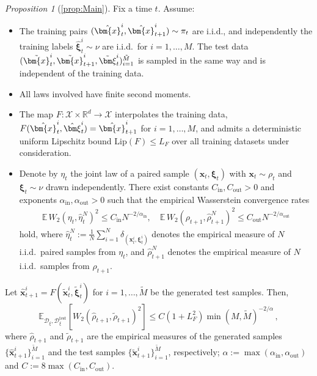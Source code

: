 \documentclass{article}
\theoremstyle{plain}
\theoremstyle{definition}
\theoremstyle{remark}
\newtheorem*{reprop}{Proposition}
\newcommand{\bfxi}{{\bm \xi}}
\newcommand{\bfx}{\bm{x}}
\newcommand{\bR}{\mathbb{R}}
\begin{document}
\begin{reprop}[\ref{prop:Main}]
  Fix a time $t$. Assume:
  \begin{itemize}
    \item[\textbf{(A1)}] The training pairs $(\hat\bfx_t^i,\hat\bfx_{t+1}^i) \sim \pi_t$ are i.i.d., and independently the training labels $\hat\bfxi_t^i \sim \nu$ are i.i.d.\ for $i=1,\dots,M$. The test data $(\tilde\bfx_t^i,\tilde\bfx_{t+1}^i,\tilde\bfxi_t^i)_{i=1}^{\tilde M}$ is sampled in the same way and is independent of the training data.
    \item[\textbf{(A2)}] All laws involved have finite second moments.
    \item[\textbf{(A3)}] The map $F: \mathcal X \times \bR^d \to \mathcal X$ interpolates the training data, $F(\hat\bfx_t^i,\hat\bfxi_t^i)=\hat\bfx_{t+1}^i$ for $i=1,\dots,M$, and admits a deterministic uniform Lipschitz bound $\mathrm{Lip}(F) \leq L_F$ over all training datasets under consideration.
    \item[\textbf{(A4)}] Denote by $\eta_t$ the joint law of a paired sample $(\bfx_t,\bfxi_t)$ with $\bfx_t \sim \rho_t$ and $\bfxi_t \sim \nu$ drawn independently. There exist constants $C_{\mathrm{in}}, C_{\mathrm{out}} > 0$ and exponents $\alpha_{\mathrm{in}}, \alpha_{\mathrm{out}} > 0$ such that the empirical Wasserstein convergence rates
    \begin{align*}
    \mathbb E\,W_2(\eta_t, \hat\eta_t^N)^2 \leq C_{\mathrm{in}} N^{-2/\alpha_{\mathrm{in}}},\quad
    \mathbb E\,W_2(\rho_{t+1}, \hat\rho_{t+1}^N)^2 \leq C_{\mathrm{out}} N^{-2/\alpha_{\mathrm{out}}}
    \end{align*}
    hold, where $\hat\eta_t^N := \tfrac{1}{N}\sum_{i=1}^N \delta_{(\bfx_t^i,\bfxi_t^i)}$ denotes the empirical measure of $N$ i.i.d.\ paired samples from $\eta_t$, and $\hat\rho_{t+1}^N$ denotes the empirical measure of $N$ i.i.d.\ samples from $\rho_{t+1}$.
  \end{itemize}
  Let $\hat{\bfx}_{t+1}^{i} = F(\tilde{\bfx}_t^i, \tilde{\bfxi}_t^i)$ for $i = 1, \dots, \tilde{M}$ be the generated test samples. Then,
  \begin{equation}
    \mathbb E_{\mathcal{D}_{\xi}, \mathcal{D}_{\xi}^{\text{test}}} \left[ W_2( \hat{\rho}_{t + 1}, \tilde \rho_{t+1} )^2 \right] \leq C ( 1 + L_F^2 ) {\min(M, \tilde M)}^{-2/\alpha}\,,
  \end{equation}
  where $\hat{\rho}_{t + 1}$ and $\tilde{\rho}_{t + 1}$ are the empirical measures of the generated samples $\{\hat{\bfx}_{t + 1}^i\}_{i = 1}^{\tilde{M}}$ and the test samples $\{\tilde{\bfx}_{t + 1}^i\}_{i = 1}^{\tilde{M}}$, respectively; $\alpha := \max(\alpha_{\mathrm{in}}, \alpha_{\mathrm{out}})$ and $C := 8\max(C_{\mathrm{in}}, C_{\mathrm{out}})$.

\end{reprop}
\end{document}
